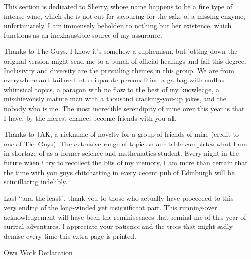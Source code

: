\documentclass[11pt,twoside]{article}
\numberwithin{Theorem}{section}
\numberwithin{Definition}{section}
\numberwithin{Lemma}{section}
\numberwithin{Algorithm}{section}
\numberwithin{equation}{section}
\begin{document}
This section is dedicated to Sherry, whose name happens to be a fine type of intense wine, which she is not cut for savouring for the sake of a missing enzyme, unfortunately.  I am immensely beholden to nothing but her existence, which functions as an inexhaustible source of my assurance.

Thanks to The Guys. I know it’s somehow a euphemism, but jotting down the original version might send me to a bunch of official hearings and fail this degree. Inclusivity and diversity are the prevailing themes in this group. We are from everywhere and tailored into disparate personalities: a gasbag with endless whimsical topics, a paragon with no flaw to the best of my knowledge, a mischievously mature man with a thousand cracking-you-up jokes, and the nobody who is me. The most incredible serendipity of mine over this year is that I have, by the merest chance, become friends with you all. 

Thanks to JAK, a nickname of novelty for a group of friends of mine (credit to one of The Guys). The extensive range of topic on our table completes what I am in shortage of as a former science and mathematics student. Every night in the future when i try to recollect the bits of my memory, I am more than certain that the time with you guys chitchatting in every decent pub of Edinburgh will be scintillating indelibly.  

Last “and the least”, thank you to those who actually have proceeded to this very ending of the long-winded yet insignificant part. This running-over acknowledgement will have been the reminiscences that remind me of this year of surreal adventures. I appreciate your patience and the trees that might sadly demise every time this extra page is printed.

\clearpage

\begin{center}
\Large{Own Work Declaration}
\end{center}
\end{document}

